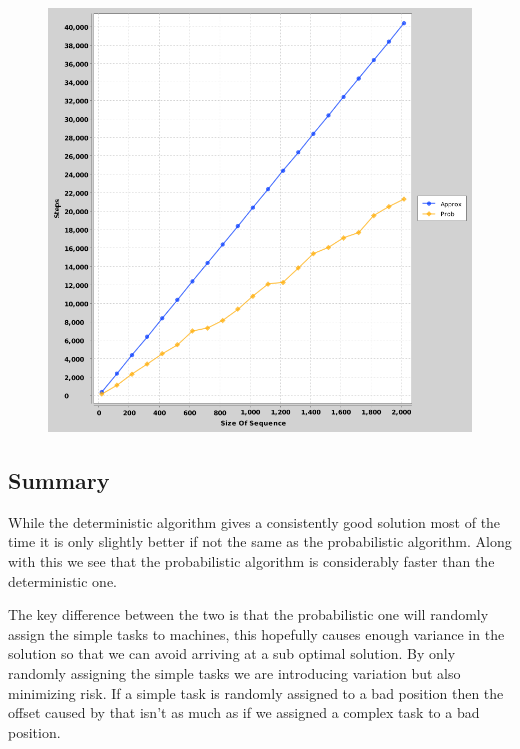 \documentclass{article}
\begin{document}
			\begin{figure}[h]
				\vspace{3mm}
				\begin{center}
					\includegraphics[scale=0.4]{CompareComplexity.png}
				\end{center}
			\end{figure}
			
			\break		
			
		\subsection{Summary}
			While the deterministic algorithm gives a consistently good solution most of the time it is only slightly better if not the same as the probabilistic algorithm. Along with this we see that the probabilistic algorithm is considerably faster than the deterministic one.\newline
			
			The key difference between the two is that the probabilistic one will randomly assign the simple tasks to machines, this hopefully causes enough variance in the solution so that we can avoid arriving at a sub optimal solution. By only randomly assigning the simple tasks we are introducing variation but also minimizing risk. If a simple task is randomly assigned to a bad position then the offset caused by that isn't as much as if we assigned a complex task to a bad position.
			
\end{document}

